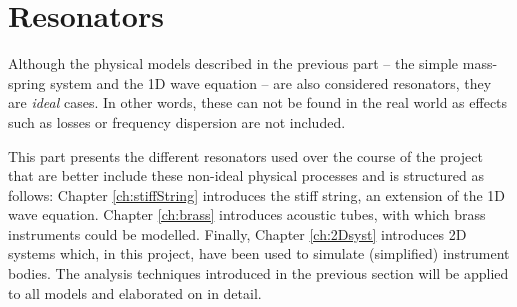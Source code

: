 \chapter*{Resonators}
Although the physical models described in the previous part -- the simple mass-spring system and the 1D wave equation -- are also considered resonators, they are \textit{ideal} cases. In other words, these can not be found in the real world as effects such as losses or frequency dispersion are not included. 

This part presents the different resonators used over the course of the project that are better include these non-ideal physical processes and is structured as follows: Chapter \ref{ch:stiffString} introduces the stiff string, an extension of the 1D wave equation.%
Chapter \ref{ch:brass} introduces acoustic tubes, with which brass instruments could be modelled. Finally, Chapter \ref{ch:2Dsyst} introduces 2D systems which, in this project, have been used to simulate (simplified) instrument bodies. The analysis techniques introduced in the previous section will be applied to all models and elaborated on in detail. 